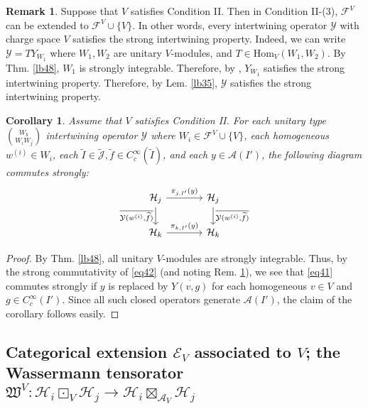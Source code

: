 \documentclass[11pt,b5paper,notitlepage]{article}
\theoremstyle{definition}
\newtheorem{rem}[df]{Remark}
\theoremstyle{plain}
\newtheorem{co}[df]{Corollary}
\newcommand{\fk}{\mathfrak}
\newcommand{\mc}{\mathcal}
\newcommand{\wtd}{\widetilde}
\newcommand{\ovl}{\overline}
\newcommand{\Hom}{\mathrm{Hom}}
\newcommand{\scr}{\mathscr}
\newcommand{\Jtd}{\widetilde{\mathcal J}}
\numberwithin{equation}{section}
\begin{document}
\begin{rem}\label{lb49}
Suppose that $V$ satisfies Condition II. Then in Condition II-(3), $\mc F^V$ can be extended to $\mc F^V\cup\{V\}$. In other words, every intertwining operator $\mc Y$ with charge space $V$ satisfies the strong intertwining property. Indeed, we can write $\mc Y=TY_{W_1}$ where $W_1,W_2$ are unitary $V$-modules, and $T\in\Hom_V(W_1,W_2)$. By Thm. \ref{lb48}, $W_1$ is strongly integrable. Therefore, by \cite[Lem. 2.3.5]{Gui20}, $Y_{W_1}$ satisfies the strong intertwining property. Therefore, by Lem. \ref{lb35}, $\mc Y$ satisfies the strong intertwining property.
\end{rem}

\begin{co}\label{lb57}
Assume that $V$ satisfies Condition II. For each unitary type $W_k\choose W_iW_j$ intertwining operator $\mc Y$ where $W_i\in\mc F^V\cup\{V\}$, each homogeneous $w^{(i)}\in W_i$, each $\wtd I\in\Jtd,\wtd f\in C_c^\infty(\wtd I)$, and  each $y\in\mc A(I')$, the following diagram commutes strongly:
\begin{equation}\label{eq41}
\begin{tikzcd}[column sep=large]
\mc H_j \arrow[d,"{\ovl{\mc Y(w^{(i)},\wtd f)}}"'] \arrow[r,"{\pi_{j,I'}(y)}"] & \mc H_j \arrow[d,"{\ovl{\mc Y(w^{(i)},\wtd f)}}"] \\
\mc H_k \arrow[r,"{\pi_{k,I'}(y)}"]           & \mc H_k        
\end{tikzcd}
\end{equation}
\end{co}

\begin{proof}
By Thm. \ref{lb48}, all unitary $V$-modules are strongly integrable. Thus, by the strong commutativity of \eqref{eq42} (and noting Rem. \ref{lb49}), we see that \eqref{eq41} commutes strongly if $y$ is replaced by $\ovl{Y(v,g)}$ for each homogeneous $v\in V$ and $g\in C_c^\infty(I')$. Since all such closed operators generate $\mc A(I')$, the claim of the corollary follows easily.
\end{proof}





\subsection{Categorical extension $\scr E_V$ associated to $V$; the Wassermann tensorator $\fk W^V:\mc H_i\boxdot_V\mc H_j\rightarrow\mc H_i\boxtimes_{\mc A_V}\mc H_j$}\label{lb65}
\end{document}
